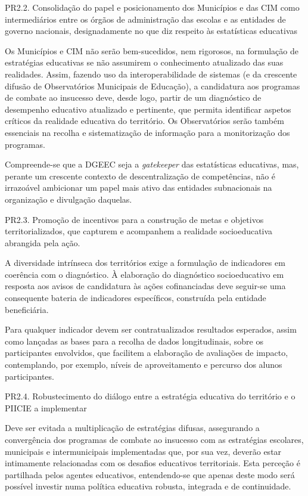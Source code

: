 \documentclass[
]{book}
\begin{document}
\leavevmode{}%
PR2.2. Consolidação do papel e posicionamento dos Municípios e das CIM como intermediários entre os órgãos de administração das escolas e as entidades de governo nacionais, designadamente no que diz respeito às estatísticas educativas

Os Municípios e CIM não serão bem-sucedidos, nem rigorosos, na formulação de estratégias educativas se não assumirem o conhecimento atualizado das suas realidades. Assim, fazendo uso da interoperabilidade de sistemas (e da crescente difusão de Observatórios Municipais de Educação), a candidatura aos programas de combate ao insucesso deve, desde logo, partir de um diagnóstico de desempenho educativo atualizado e pertinente, que permita identificar aspetos críticos da realidade educativa do território. Os Observatórios serão também essenciais na recolha e sistematização de informação para a monitorização dos programas.

Compreende-se que a DGEEC seja a \emph{gatekeeper} das estatísticas educativas, mas, perante um crescente contexto de descentralização de competências, não é irrazoável ambicionar um papel mais ativo das entidades subnacionais na organização e divulgação daquelas.

\leavevmode{}%
PR2.3. Promoção de incentivos para a construção de metas e objetivos territorializados, que capturem e acompanhem a realidade socioeducativa abrangida pela ação.

A diversidade intrínseca dos territórios exige a formulação de indicadores em coerência com o diagnóstico. À elaboração do diagnóstico socioeducativo em resposta aos avisos de candidatura às ações cofinanciadas deve seguir-se uma consequente bateria de indicadores específicos, construída pela entidade beneficiária.

Para qualquer indicador devem ser contratualizados resultados esperados, assim como lançadas as bases para a recolha de dados longitudinais, sobre os participantes envolvidos, que facilitem a elaboração de avaliações de impacto, contemplando, por exemplo, níveis de aproveitamento e percurso dos alunos participantes.

\leavevmode{}%
PR2.4. Robustecimento do diálogo entre a estratégia educativa do território e o PIICIE a implementar

Deve ser evitada a multiplicação de estratégias difusas, assegurando a convergência dos programas de combate ao insucesso com as estratégias escolares, municipais e intermunicipais implementadas que, por sua vez, deverão estar intimamente relacionadas com os desafios educativos territoriais. Esta perceção é partilhada pelos agentes educativos, entendendo-se que apenas deste modo será possível investir numa política educativa robusta, integrada e de continuidade.
\end{document}
